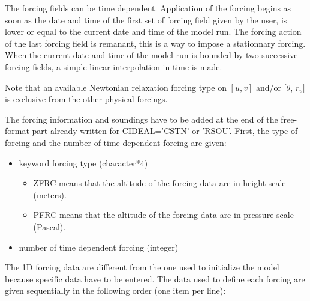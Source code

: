 The forcing fields can be time dependent. Application of the forcing begins as
soon as the date and time of the first set of forcing field given by the
user, is lower or equal to the current date and time of the model run. The
forcing action of the last forcing field is remanant, this is a way to impose
a stationnary forcing. When the current date and time of the model run is
bounded by two successive forcing fields, a simple linear interpolation in time
is made.

Note that an available Newtonian relaxation forcing type on $[u, v]$ and/or
$[\theta$, $r_v]$ is exclusive from the other physical forcings.

The forcing information and soundings have to be added at the end of the
free-format part already written for CIDEAL='CSTN' or 'RSOU'. First, the
type of forcing and the number of time dependent forcing are given:

\begin{itemize}
\item keyword forcing type (character*4)
\begin{itemize}
\item ZFRC means that the altitude of the forcing data are in height scale
(meters).
\item PFRC means that the altitude of the forcing data are in pressure scale
(Pascal).
\end{itemize}

\item number of time dependent forcing (integer)
\end{itemize}

The 1D forcing data are different from the one used to initialize the model
because specific data have to be entered. The data used to define each forcing
are given sequentially in the following order (one item per line):

